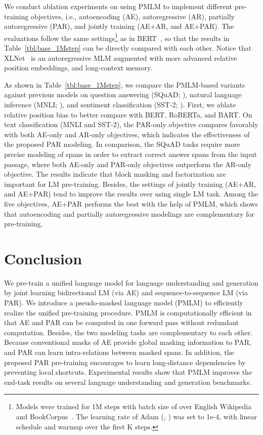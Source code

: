 \documentclass{article}
\newcommand\pmlmfull{pseudo-masked language model}
\newcommand\pmlm{\textsc{PMLM}}
\begin{document}
We conduct ablation experiments on using \pmlm{} to implement different pre-training objectives, i.e., autoencoding (AE), autoregressive (AR), partially autoregressive (PAR), and jointly training (AE+AR, and AE+PAR).
The evaluations follow the same settings\footnote{Models were trained for 1M steps with batch size of  over English Wikipedia and BookCorpus~\cite{bookcorpus}. The learning rate of Adam (, ) was set to 1e-4, with linear schedule and warmup over the first K steps.} as in BERT~\cite{bert}, so that the results in Table~\ref{tbl:base_1Mstep} can be directly compared with each other.
Notice that XLNet~\cite{xlnet} is an autoregressive MLM augmented with more advanced relative position embeddings, and long-context memory.


As shown in Table~\ref{tbl:base_1Mstep}, we compare the \pmlm{}-based variants against previous models on question answering (SQuAD; \citealt{squad1,squad2}), natural language inference (MNLI; \citealt{mnli2017}), and sentiment classification (SST-2; \citealt{sst2013}).
First, we ablate relative position bias to better compare with BERT, RoBERTa, and BART.
On text classification (MNLI and SST-2), the PAR-only objective compares favorably with both AE-only and AR-only objectives, which indicates the effectiveness of the proposed PAR modeling.
In comparison, the SQuAD tasks require more precise modeling of spans in order to extract correct answer spans from the input passage, where both AE-only and PAR-only objectives outperform the AR-only objective.
The results indicate that block masking and factorization are important for LM pre-training.
Besides, the settings of jointly training (AE+AR, and AE+PAR) tend to improve the results over using single LM task.
Among the five objectives, AE+PAR performs the best with the help of \pmlm{}, which shows that autoencoding and partially autoregressive modelings are complementary for pre-training.


\section{Conclusion}

We pre-train a unified language model for language understanding and generation by joint learning bidirectional LM (via AE) and sequence-to-sequence LM (via PAR).
We introduce a \pmlmfull{} (\pmlm{}) to efficiently realize the unified pre-training procedure.
\pmlm{} is computationally efficient in that AE and PAR can be computed in one forward pass without redundant computation.
Besides, the two modeling tasks are complementary to each other.
Because conventional masks of AE provide global masking information to PAR, and PAR can learn intra-relations between masked spans.
In addition, the proposed PAR pre-training encourages to learn long-distance dependencies by preventing local shortcuts.
Experimental results show that \pmlm{} improves the end-task results on several language understanding and generation benchmarks.
\end{document}
